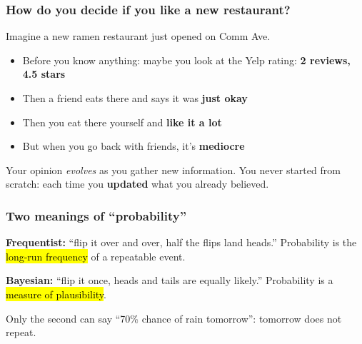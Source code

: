 \documentclass[slidestop,compress,mathserif]{beamer}
\begin{document}
\begin{frame}
\frametitle{How do you decide if you like a new restaurant?}

Imagine a new ramen restaurant just opened on Comm Ave.

\pause
\medskip


\pause

\begin{itemize}
\item Before you know anything: maybe you look at the Yelp rating: \textbf{2 reviews, 4.5 stars}
\pause
\item Then a friend eats there and says it was \textbf{just okay}
\pause
\item Then you eat there yourself and \textbf{like it a lot}
\pause
\item But when you go back with friends, it's \textbf{mediocre}
\end{itemize}

\pause
\medskip

Your opinion \emph{evolves} as you gather new information. You never started from scratch: each time you \textbf{updated} what you already believed.

\end{frame}

\begin{frame}
\frametitle{Two meanings of ``probability''}


\pause

\textbf{Frequentist:} ``flip it over and over, half the flips land heads.'' Probability is the \hl{long-run frequency} of a repeatable event.

\pause
\medskip

\textbf{Bayesian:} ``flip it once, heads and tails are equally likely.'' Probability is a \hl{measure of plausibility}.

\pause
\medskip

Only the second can say ``70\% chance of rain tomorrow'': tomorrow does not repeat.

\end{frame}
\end{document}
